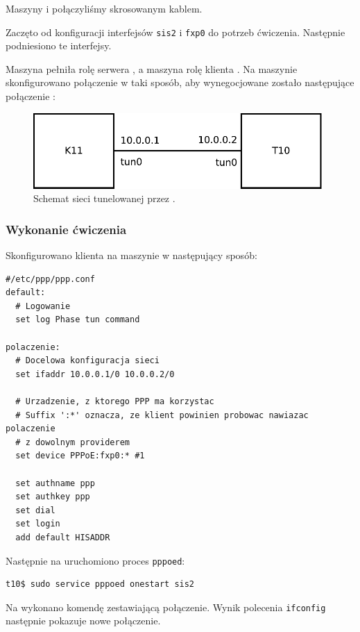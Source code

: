 Maszyny \pppcli{} i \pppserv{} połączyliśmy skrosowanym kablem.

Zaczęto od konfiguracji interfejsów \texttt{sis2} i \texttt{fxp0} do potrzeb
ćwiczenia. Następnie podniesiono te interfejsy.

Maszyna \pppserv{} pełniła rolę serwera \ppp, a maszyna \pppcli{} rolę klienta
\ppp. Na maszynie \pppcli{} skonfigurowano połączenie w taki sposób, aby
wynegocjowane zostało następujące połączenie \tcp{}:

\begin{figure}[h!]
  \centering
  \includegraphics[width=11cm]{figury/ppp/schemat-po.pdf}
  \caption{Schemat sieci tunelowanej przez \ppp.}
  \label{fig:ppp:schemat-sieci-po}
\end{figure}


\subsubsection{Wykonanie ćwiczenia}

Skonfigurowano klienta \ppp{} na maszynie \pppcli{} w następujący sposób:

\begin{lstlisting}
#/etc/ppp/ppp.conf
default:
  # Logowanie
  set log Phase tun command

polaczenie:
  # Docelowa konfiguracja sieci
  set ifaddr 10.0.0.1/0 10.0.0.2/0

  # Urzadzenie, z ktorego PPP ma korzystac
  # Suffix ':*' oznacza, ze klient powinien probowac nawiazac polaczenie
  # z dowolnym providerem
  set device PPPoE:fxp0:* #1

  set authname ppp
  set authkey ppp
  set dial
  set login
  add default HISADDR
\end{lstlisting}

Następnie na \pppserv{} uruchomiono proces \texttt{pppoed}:

\begin{lstlisting}
t10$ sudo service pppoed onestart sis2
\end{lstlisting}

Na \pppcli{} wykonano komendę zestawiającą połączenie. Wynik polecenia
\texttt{ifconfig} następnie pokazuje nowe połączenie.

